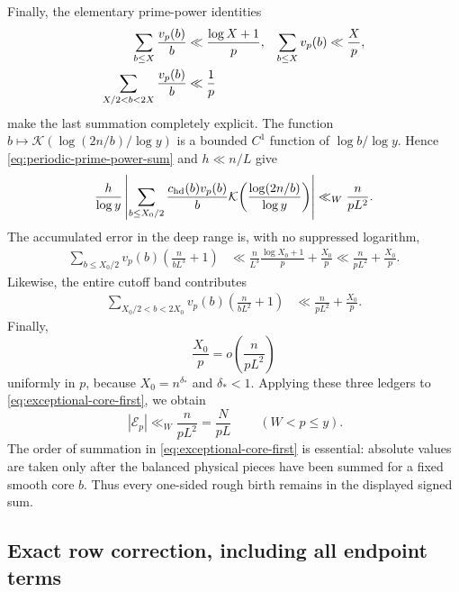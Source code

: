 \documentclass[11pt]{article}
\numberwithin{equation}{section}
\theoremstyle{definition}
\theoremstyle{remark}
\newcommand{\1}{\mathbf 1}
\begin{document}
Finally, the elementary prime-power identities
\begin{align}
 \sum_{b\le X}\frac{v_p(b)}b&\ll\frac{\log X+1}{p},
 &\sum_{b\le X}v_p(b)&\ll\frac Xp,\notag\\
 \sum_{X/2<b<2X}\frac{v_p(b)}b&\ll\frac1p
 \label{eq:exceptional-prime-power-sums}
\end{align}
make the last summation completely explicit.  The function
\(b\mapsto\mathcal K(\log(2n/b)/\log y)\) is a bounded \(C^1\)
function of \(\log b/\log y\).  Hence
\eqref{eq:periodic-prime-power-sum} and \(h\ll n/L\) give
\begin{equation}
 \frac h{\log y}\left|
  \sum_{b\le X_0/2}\frac{c_{\rm hd}(b)v_p(b)}b
   \mathcal K\!\left(\frac{\log(2n/b)}{\log y}\right)\right|
 \ll_W\frac{n}{pL^2}.
 \label{eq:exceptional-leading-ledger}
\end{equation}
The accumulated error in the deep range is, with no suppressed logarithm,
\begin{align}
 \sum_{b\le X_0/2}v_p(b)
      \left(\frac n{bL^3}+1\right)
 &\ll \frac n{L^3}\frac{\log X_0+1}{p}+\frac{X_0}{p}
 \ll\frac{n}{pL^2}+\frac{X_0}{p}.
 \label{eq:exceptional-deep-error-ledger}
\end{align}
Likewise, the entire cutoff band contributes
\begin{align}
 \sum_{X_0/2<b<2X_0}v_p(b)
      \left(\frac n{bL^2}+1\right)
 &\ll\frac{n}{pL^2}+\frac{X_0}{p}.
 \label{eq:exceptional-cutoff-error-ledger}
\end{align}
Finally,
\begin{equation}
 \frac{X_0}{p}=o\!\left(\frac{n}{pL^2}\right)
 \label{eq:exceptional-X0-absorbed}
\end{equation}
uniformly in \(p\), because \(X_0=n^{\delta_*}\) and
\(\delta_*<1\).  Applying these three ledgers to
\eqref{eq:exceptional-core-first}, we obtain
\begin{equation}
 \boxed{\ |\mathcal E_p|\ll_W\frac{n}{pL^2}
       =\frac{N}{pL}\ }
 \qquad(W<p\le y).
 \label{eq:signed-exceptional-bound}
\end{equation}
The order of summation in \eqref{eq:exceptional-core-first} is essential:
absolute values are taken only after the balanced physical pieces have
been summed for a fixed smooth core \(b\).  Thus every one-sided rough
birth remains in the displayed signed sum.

\subsection{Exact row correction, including all endpoint terms}
\label{subsec:exact-rough-row-correction}
\end{document}
